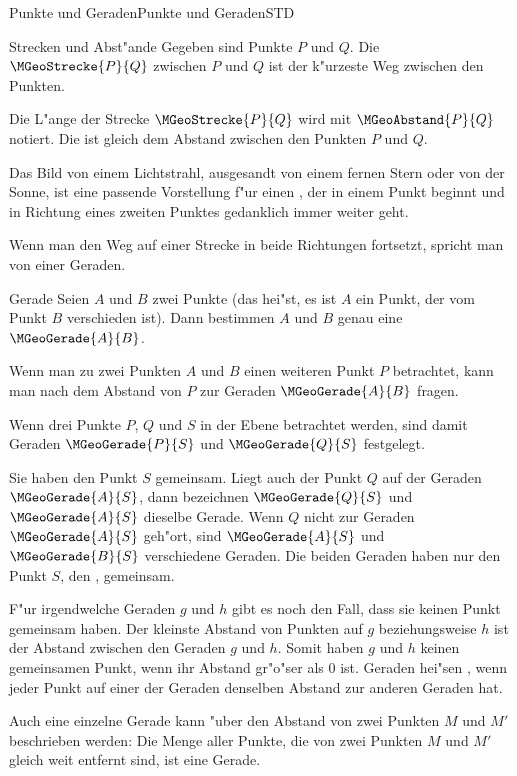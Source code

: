\begin{MXContent}{Punkte und Geraden}{Punkte und Geraden}{STD}
\begin{MXInfo}{Strecken und Abst"ande}
Gegeben sind Punkte $P$ und $Q$. Die  
$\MGeoStrecke{P}{Q}$ zwischen $P$ und $Q$ ist der k"urzeste Weg zwischen den 
Punkten. 

Die L"ange der Strecke $\MGeoStrecke{P}{Q}$ wird mit $\MGeoAbstand{P}{Q}$ notiert.
Die  ist gleich dem Abstand zwischen den
Punkten $P$ und $Q$.
\end{MXInfo}

Das Bild von einem Lichtstrahl, ausgesandt von einem fernen Stern oder 
von der Sonne, ist eine passende Vorstellung f"ur einen 
, der in einem Punkt beginnt und in Richtung eines
zweiten Punktes gedanklich immer weiter geht.

Wenn man den Weg auf einer Strecke in beide Richtungen fortsetzt, spricht 
man von einer Geraden.

\begin{MXInfo}{Gerade}
Seien $A$ und $B$ zwei Punkte (das hei"st, es ist $A$ ein Punkt, der vom 
Punkt $B$ verschieden ist). Dann bestimmen $A$ und $B$ genau eine 
 $\MGeoGerade{A}{B}$.
\end{MXInfo}
Wenn man zu zwei Punkten $A$ und $B$ einen weiteren Punkt $P$ betrachtet,
kann man nach dem Abstand von $P$ zur Geraden $\MGeoGerade{A}{B}$ fragen.

Wenn drei Punkte $P$, $Q$ und $S$ in der Ebene betrachtet werden, sind damit
Geraden $\MGeoGerade{P}{S}$ und $\MGeoGerade{Q}{S}$ festgelegt.

Sie haben den Punkt $S$ gemeinsam. Liegt auch der Punkt $Q$ auf der Geraden 
$\MGeoGerade{A}{S}$, dann bezeichnen $\MGeoGerade{Q}{S}$ und $\MGeoGerade{A}{S}$
dieselbe Gerade. 
Wenn $Q$ nicht zur Geraden $\MGeoGerade{A}{S}$ geh"ort, sind $\MGeoGerade{A}{S}$
und $\MGeoGerade{B}{S}$ verschiedene Geraden. Die beiden Geraden haben nur 
den Punkt $S$, den , gemeinsam.

F"ur irgendwelche Geraden $g$ und $h$ gibt es noch den Fall, dass sie keinen 
Punkt gemeinsam haben. Der kleinste Abstand von Punkten auf $g$ beziehungsweise
$h$ ist der Abstand zwischen den Geraden $g$ und $h$. Somit haben $g$ und $h$
keinen gemeinsamen Punkt, wenn ihr Abstand gr"o"ser als $0$ ist.
Geraden hei"sen , wenn jeder Punkt auf einer der 
Geraden denselben Abstand zur anderen Geraden hat.

Auch eine einzelne Gerade kann "uber den Abstand von zwei Punkten $M$ und $M'$ 
beschrieben werden: Die Menge aller Punkte, die von zwei Punkten $M$ und $M'$ 
gleich weit entfernt sind, ist eine Gerade.


\end{MXContent}
